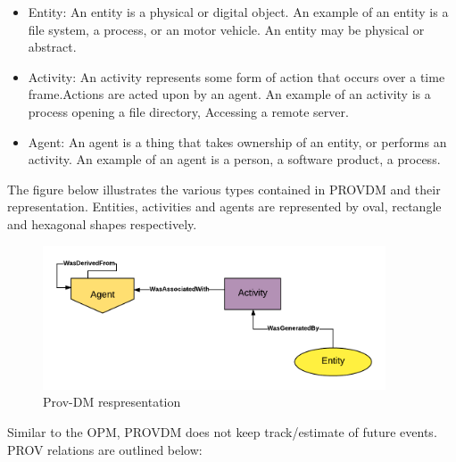 \begin{itemize}

\item Entity: An entity is a physical or digital object. An example of an entity is a file system, a process, or an motor vehicle. An entity may be physical or abstract.

\item Activity: An activity represents some form of action that occurs over a time frame.Actions are acted upon by an agent. An example of an activity is a process opening a file directory, Accessing a remote server.

\item Agent: An agent is a thing that takes ownership of an entity, or performs an activity. An example of an agent is a person, a software product, a process.
\end{itemize}

The figure below illustrates the various types contained in PROV\-DM and their representation. Entities, activities and agents are represented by oval, rectangle and hexagonal shapes respectively.

\begin{figure}[h]
\begin{center}

\includegraphics[width=4.0in]{prov_dm_1.PNG}
\end{center}
\caption{Prov-DM respresentation }
\end{figure}

Similar to the OPM, PROV\-DM does not keep track/estimate of future events. PROV relations are outlined below:


